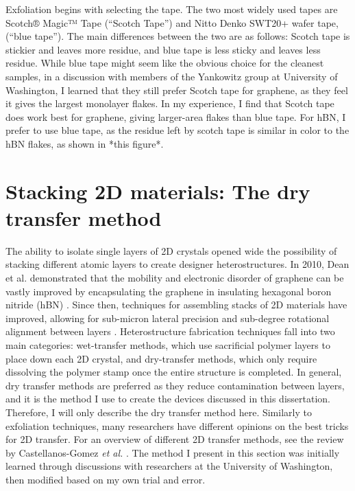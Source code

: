 \documentclass[double,12pt,1in]{beavtex}
\begin{document}
Exfoliation begins with selecting the tape. The two most widely used tapes are Scotch® Magic™ Tape (“Scotch Tape”) and Nitto Denko SWT20+ wafer tape, (“blue tape”). The main differences between the two are as follows: Scotch tape is stickier and leaves more residue, and blue tape is less sticky and leaves less residue. While blue tape might seem like the obvious choice for the cleanest samples, in a discussion with members of the Yankowitz group at University of Washington, I learned that they still prefer Scotch tape for graphene, as they feel it gives the largest monolayer flakes. In my experience, I find that Scotch tape does work best for graphene, giving larger-area flakes than blue tape. For hBN, I prefer to use blue tape, as the residue left by scotch tape is similar in color to the hBN flakes, as shown in *this figure*.

\section{Stacking 2D materials: The dry transfer method}
The ability to isolate single layers of 2D crystals opened wide the possibility of stacking different atomic layers to create designer heterostructures. In 2010, Dean et al. demonstrated that the mobility and electronic disorder of graphene can be vastly improved by encapsulating the graphene in insulating hexagonal boron nitride (hBN) \cite{dean_boron_2010}. Since then, techniques for assembling stacks of 2D materials have improved, allowing for sub-micron lateral precision and sub-degree rotational alignment between layers \cite{castellanos-gomez_van_2022}. Heterostructure fabrication techniques fall into two main categories: wet-transfer methods, which use sacrificial polymer layers to place down each 2D crystal, and dry-transfer methods, which only require dissolving the polymer stamp once the entire structure is completed. In general, dry transfer methods are preferred as they reduce contamination between layers, and it is the method I use to create the devices discussed in this dissertation. Therefore, I will only describe the dry transfer method here. Similarly to exfoliation techniques, many researchers have different opinions on the best tricks for 2D transfer. For an overview of different 2D transfer methods, see the review by Castellanos-Gomez \textit{et al.} \cite{castellanos-gomez_van_2022}. The method I present in this section was initially learned through discussions with researchers at the University of Washington, then modified based on my own trial and error.
\end{document}
